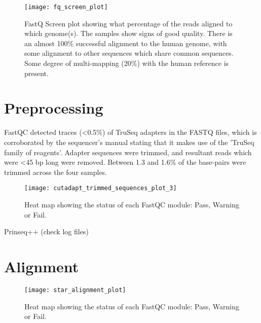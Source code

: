 \begin{figure}[!h]
    \centering
    \texttt{[image: fq\_screen\_plot]}
    \caption[FastQ Screen plot showing what percentage of the reads aligned to which genome(s)]{FastQ Screen plot showing what percentage of the reads aligned to which genome(s). The samples show signs of good quality. There is an almost 100\% successful alignment to the human genome, with some alignment to other sequences which share common sequences. Some degree of multi-mapping (20\%) with the human reference is present.} 
    \label{fig:fq_screen_plot}
\end{figure}




\section{Preprocessing}
FastQC detected traces (<0.5\%) of TruSeq adapters in the FASTQ files, which is corroborated by the sequencer's manual \citep{HiSeq2000} stating that it makes use of the 'TruSeq family of reagents'. Adapter sequences were trimmed, and resultant reads which were <45 bp long were removed. Between 1.3 and 1.6\% of the base-pairs were trimmed across the four samples.


\begin{figure}[!h]
    \centering
    \texttt{[image: cutadapt\_trimmed\_sequences\_plot\_3]}
    \caption[Heat map showing the status of each FastQC module]{Heat map showing the status of each FastQC module: Pass, Warning or Fail.} 
    \label{fig:cutadapt_trimmed_sequences_plot_3}
\end{figure}

Prinseq++ (check log files)

\section{Alignment}

\begin{figure}[!h]
    \centering
    \texttt{[image: star\_alignment\_plot]}
    \caption[Heat map showing the status of each FastQC module]{Heat map showing the status of each FastQC module: Pass, Warning or Fail.} 
    \label{fig:star_alignment_plot}
\end{figure}




